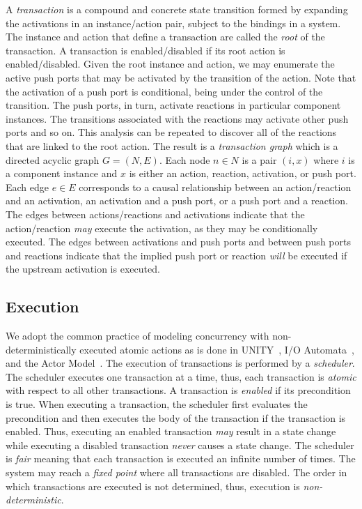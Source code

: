 A \emph{transaction} is a compound and concrete state transition formed by expanding the activations in an instance/action pair, subject to the bindings in a system.
The instance and action that define a transaction are called the \emph{root} of the transaction.
A transaction is enabled/disabled if its root action is enabled/disabled.
Given the root instance and action, we may enumerate the active push ports that may be activated by the transition of the action.
Note that the activation of a push port is conditional, being under the control of the transition.
The push ports, in turn, activate reactions in particular component instances.
The transitions associated with the reactions may activate other push ports and so on.
This analysis can be repeated to discover all of the reactions that are linked to the root action.
The result is a \emph{transaction graph} which is a directed acyclic graph $G = (N,E)$.
Each node $n \in N$ is a pair $(i, x)$ where $i$ is a component instance and $x$ is either an action, reaction, activation, or push port.
Each edge $e \in E$ corresponds to a causal relationship between an action/reaction and an activation, an activation and a push port, or a push port and a reaction.
The edges between actions/reactions and activations indicate that the action/reaction \emph{may} execute the activation, as they may be conditionally executed.
The edges between activations and push ports and between push ports and reactions indicate that the implied push port or reaction \emph{will} be executed if the upstream activation is executed.

\subsection{Execution}
\label{execution}
We adopt the common practice of modeling concurrency with non-deterministically executed atomic actions as is done in UNITY~\cite{chandy1989parallel}, I/O Automata~\cite{nancy1996distributed}, and the Actor Model~\cite{agha1985actors}.
The execution of transactions is performed by a \emph{scheduler}.
The scheduler executes one transaction at a time, thus, each transaction is \emph{atomic} with respect to all other transactions.
A transaction is \emph{enabled} if its precondition is true.
When executing a transaction, the scheduler first evaluates the precondition and then executes the body of the transaction if the transaction is enabled.
Thus, executing an enabled transaction \emph{may} result in a state change while executing a disabled transaction \emph{never} causes a state change.
The scheduler is \emph{fair} meaning that each transaction is executed an infinite number of times.
The system may reach a \emph{fixed point} where all transactions are disabled.
The order in which transactions are executed is not determined, thus, execution is \emph{non-deterministic}.

